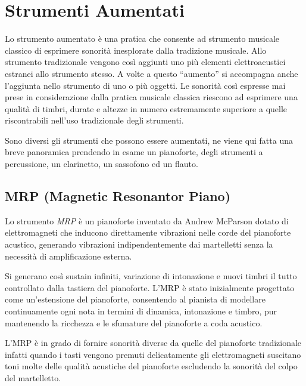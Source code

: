 
\chapter{Strumenti Aumentati}
\label{chp:strumentiaumentati}

Lo strumento aumentato  è una pratica che consente  ad strumento musicale
classico di esprimere sonorità inesplorate dalla tradizione musicale.
Allo strumento tradizionale vengono così aggiunti uno più elementi
elettroacustici estranei allo strumento stesso. A volte a questo “aumento” si
accompagna anche l’aggiunta nello strumento di uno o più oggetti.
Le sonorità così espresse mai prese in considerazione dalla pratica musicale
classica riescono ad esprimere una qualità di timbri, durate e altezze in numero
estremamente superiore a quelle riscontrabili nell’uso tradizionale degli
strumenti.

Sono diversi gli strumenti che possono essere aumentati, ne viene qui fatta una
breve panoramica prendendo in esame un pianoforte, degli strumenti a percussione,
un clarinetto, un sassofono ed un flauto.

\section{MRP (Magnetic Resonantor Piano)}

Lo strumento \emph{MRP} è un pianoforte inventato da Andrew McParson dotato di
elettromagneti  che inducono direttamente vibrazioni nelle corde del pianoforte
acustico, generando vibrazioni indipendentemente dai martelletti senza la
necessità di amplificazione esterna.

Si generano così sustain infiniti, variazione di intonazione e nuovi timbri il
tutto controllato dalla tastiera del pianoforte.
L'MRP è stato inizialmente progettato come un'estensione del pianoforte,
consentendo al pianista di modellare continuamente ogni nota in termini di
dinamica, intonazione e timbro, pur mantenendo la ricchezza e le sfumature del
pianoforte a coda acustico.

L'MRP è in grado di fornire sonorità diverse da quelle del pianoforte
tradizionale infatti quando i tasti vengono premuti delicatamente gli
elettromagneti suscitano toni molte delle qualità acustiche del pianoforte
escludendo la sonorità del colpo del martelletto.

